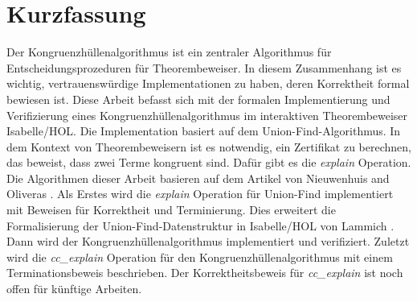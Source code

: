 \chapter{Kurzfassung}

Der Kongruenzhüllenalgorithmus ist ein zentraler Algorithmus für Entscheidungsprozeduren für Theorembeweiser. In diesem Zusammenhang ist es wichtig, vertrauenswürdige Implementationen zu haben, deren Korrektheit formal bewiesen ist. Diese Arbeit befasst sich mit der formalen Implementierung und Verifizierung eines Kongruenzhüllenalgorithmus im interaktiven Theorembeweiser Isabelle/HOL. Die Implementation basiert auf dem Union-Find-Algorithmus. In dem Kontext von Theorembeweisern ist es notwendig, ein Zertifikat zu berechnen, das beweist, dass zwei Terme kongruent sind. Dafür gibt es die \emph{explain} Operation. Die Algorithmen dieser Arbeit basieren auf dem Artikel von Nieuwenhuis and Oliveras \cite{Nieuwenhuis}.
Als Erstes wird die \emph{explain} Operation für Union-Find implementiert mit Beweisen für Korrektheit und Terminierung. Dies erweitert die Formalisierung der Union-Find-Datenstruktur in Isabelle/HOL von Lammich \cite{unionfind-isabelle}. Dann wird der Kongruenzhüllenalgorithmus implementiert und verifiziert. Zuletzt wird die \emph{cc\_explain} Operation für den Kongruenzhüllenalgorithmus mit einem Terminationsbeweis beschrieben. Der Korrektheitsbeweis für \emph{cc\_explain} ist noch offen für künftige Arbeiten.